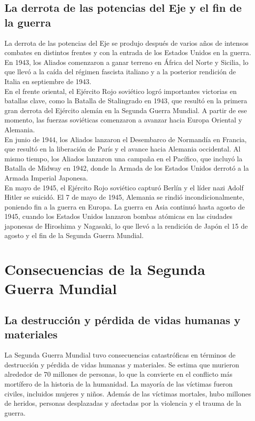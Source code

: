 \documentclass{article}
\theoremstyle{mytheoremstyle}
\theoremstyle{mytheoremstyle}
\theoremstyle{myproblemstyle}
\begin{document}
\subsection{La derrota de las potencias del Eje y el fin de la guerra}

La derrota de las potencias del Eje se produjo después de varios años de intensos combates en distintos frentes y con la entrada de los Estados Unidos en la guerra. En 1943, los Aliados comenzaron a ganar terreno en África del Norte y Sicilia, lo que llevó a la caída del régimen fascista italiano y a la posterior rendición de Italia en septiembre de 1943.\\

En el frente oriental, el Ejército Rojo soviético logró importantes victorias en batallas clave, como la Batalla de Stalingrado en 1943, que resultó en la primera gran derrota del Ejército alemán en la Segunda Guerra Mundial. A partir de ese momento, las fuerzas soviéticas comenzaron a avanzar hacia Europa Oriental y Alemania.\\

En junio de 1944, los Aliados lanzaron el Desembarco de Normandía en Francia, que resultó en la liberación de París y el avance hacia Alemania occidental. Al mismo tiempo, los Aliados lanzaron una campaña en el Pacífico, que incluyó la Batalla de Midway en 1942, donde la Armada de los Estados Unidos derrotó a la Armada Imperial Japonesa.\\

En mayo de 1945, el Ejército Rojo soviético capturó Berlín y el líder nazi Adolf Hitler se suicidó. El 7 de mayo de 1945, Alemania se rindió incondicionalmente, poniendo fin a la guerra en Europa. La guerra en Asia continuó hasta agosto de 1945, cuando los Estados Unidos lanzaron bombas atómicas en las ciudades japonesas de Hiroshima y Nagasaki, lo que llevó a la rendición de Japón el 15 de agosto y el fin de la Segunda Guerra Mundial.\\

\newpage
\section{Consecuencias de la Segunda Guerra Mundial}
\subsection{La destrucción y pérdida de vidas humanas y materiales}

La Segunda Guerra Mundial tuvo consecuencias catastróficas en términos de destrucción y pérdida de vidas humanas y materiales. Se estima que murieron alrededor de 70 millones de personas, lo que la convierte en el conflicto más mortífero de la historia de la humanidad. La mayoría de las víctimas fueron civiles, incluidos mujeres y niños. Además de las víctimas mortales, hubo millones de heridos, personas desplazadas y afectadas por la violencia y el trauma de la guerra.\\
\end{document}
